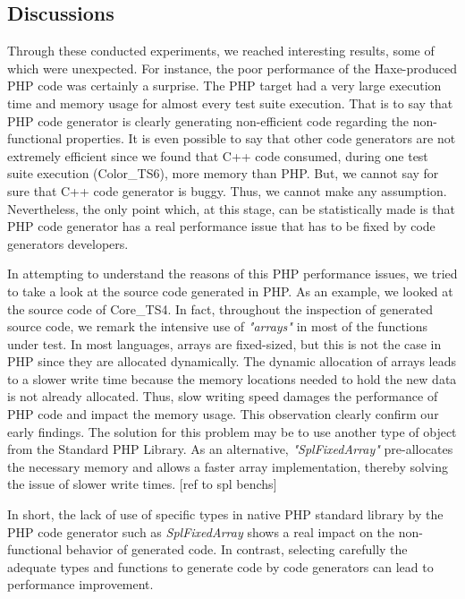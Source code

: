 \subsection{Discussions}
Through these conducted experiments, we reached interesting results, some of which were unexpected.
For instance, the poor performance of the Haxe-produced PHP code was certainly a surprise. 
The PHP target had a very large execution time and memory usage for almost every test suite execution. 
That is to say that PHP code generator is clearly generating non-efficient code regarding the non-functional properties. It is even possible to say that other code generators are not extremely efficient since we found that C++ code consumed, during one test suite execution (Color\_TS6), more memory than PHP. But, we cannot say for sure that C++ code generator is buggy. Thus, we cannot make any assumption. Nevertheless, the only point which, at this stage, can be statistically made is that PHP code generator has a real performance issue that has to be fixed by code generators developers. 

In attempting to understand the reasons of this PHP performance issues, we tried to take a look at the source code generated in PHP. As an example, we looked at the source code of Core\_TS4. 
In fact, throughout the inspection of generated source code, we remark the intensive use of \textit{"arrays"} in most of the functions under test. In most languages, arrays are fixed-sized, but this is not the case in PHP since they are allocated dynamically. The dynamic allocation of arrays  leads to a slower write time because the memory locations needed to hold the new data is not already allocated. Thus, slow writing speed damages the performance of PHP code and impact the memory usage. This observation clearly confirm our early findings. The solution for this problem may be to use another type of object from the Standard PHP Library. As an alternative, \textit{"SplFixedArray"} pre-allocates the necessary memory and allows a faster array implementation, thereby solving the issue of slower write times. [ref to spl benchs]

In short, the lack of use of specific types in native PHP standard library by the PHP code generator such as \textit{SplFixedArray} shows a real impact on the non-functional behavior of generated code. In contrast, selecting carefully the adequate types and functions to generate code by code generators can lead to performance improvement.  


 






